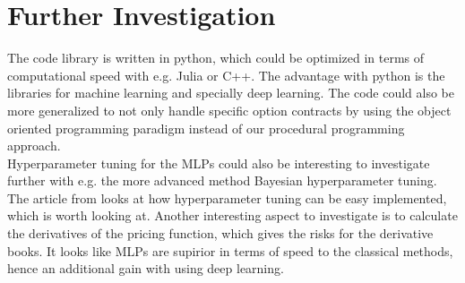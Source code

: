 \section{Further Investigation}
The code library is written in python, which could be optimized in terms of computational speed with e.g. Julia or C++. The advantage with python is the libraries for machine learning and specially deep learning. The code could also be more generalized to not only handle specific option contracts by using the object oriented programming paradigm instead of our procedural programming approach.\\

Hyperparameter tuning for the MLPs could also be interesting to investigate further with e.g. the more advanced method Bayesian hyperparameter tuning. The article from \parencite{liaw2018tune} looks at how hyperparameter tuning can be easy implemented, which is worth looking at. Another interesting aspect to investigate is to calculate the derivatives of the pricing function, which gives the risks for the derivative books. It looks like MLPs are supirior in terms of speed to the classical methods, hence an additional gain with using deep learning.

